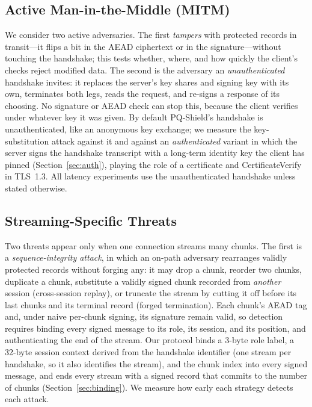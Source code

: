 \documentclass[conference]{IEEEtran}
\begin{document}
\subsection{Active Man-in-the-Middle (MITM)}
We consider two active adversaries. The first \emph{tampers} with protected records in transit---it
flips a bit in the AEAD ciphertext or in the signature---without touching the handshake; this tests
whether, where, and how quickly the client's checks reject modified data. The second is the adversary
an \emph{unauthenticated} handshake invites: it replaces the server's key shares and signing key with
its own, terminates both legs, reads the request, and re-signs a response of its choosing. No
signature or AEAD check can stop this, because the client verifies under whatever key it was given.
By default PQ-Shield's handshake is unauthenticated, like an anonymous key exchange; we measure the
key-substitution attack against it and against an \emph{authenticated} variant in which the server
signs the handshake transcript with a long-term identity key the client has pinned
(Section~\ref{sec:auth}), playing the role of a certificate and CertificateVerify in TLS~1.3. All
latency experiments use the unauthenticated handshake unless stated otherwise.

\subsection{Streaming-Specific Threats}
Two threats appear only when one connection streams many chunks. The first is a
\emph{sequence-integrity attack}, in which an on-path adversary rearranges validly protected records
without forging any: it may drop a chunk, reorder two chunks, duplicate a chunk, substitute a validly
signed chunk recorded from \emph{another} session (cross-session replay), or truncate the stream by
cutting it off before its last chunks and its terminal record (forged termination). Each chunk's AEAD
tag and, under naive per-chunk signing, its signature remain valid, so detection requires binding
every signed message to its role, its session, and its position, and authenticating the end of the
stream. Our protocol binds a 3-byte role label, a 32-byte session context derived from the handshake
identifier (one stream per handshake, so it also identifies the stream), and the chunk index into
every signed message, and ends every stream with a signed record that commits to the number of chunks
(Section~\ref{sec:binding}). We measure how early each strategy detects each attack.
\end{document}
